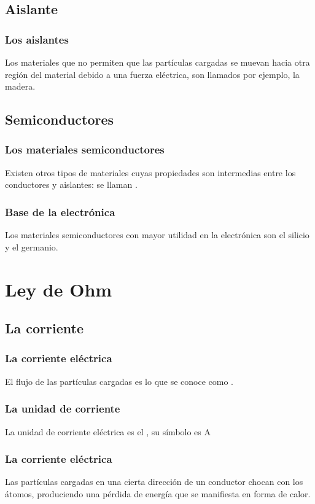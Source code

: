 \documentclass[14pt]{beamer}
\begin{document}
\subsection{Aislante}

\begin{frame}
\frametitle{Los aislantes}
Los materiales que no permiten que las partículas cargadas se muevan hacia otra región del material debido a una fuerza eléctrica, son llamados  por ejemplo, la madera.
\end{frame}

\subsection{Semiconductores}

\begin{frame}
\frametitle{Los materiales semiconductores}
Existen otros tipos de materiales cuyas propiedades son intermedias entre los conductores y aislantes: \pause  se llaman .
\end{frame}
\begin{frame}
\frametitle{Base de la electrónica}
Los materiales semiconductores con mayor utilidad en la electrónica son el silicio y el germanio.
\end{frame}

\section{Ley de Ohm}
\subsection{La corriente}

\begin{frame}
\frametitle{La corriente eléctrica}
El flujo de las partículas cargadas es lo que se conoce como .
\end{frame}
\begin{frame}
\frametitle{La unidad de corriente}
La unidad de corriente eléctrica es el , su símbolo es \si{\ampere}
\end{frame}
\begin{frame}
\frametitle{La corriente eléctrica}
Las partículas cargadas en una cierta dirección de un conductor chocan con los átomos, \pause produciendo una pérdida de energía que se manifiesta en forma de calor.
\end{frame}
\end{document}

